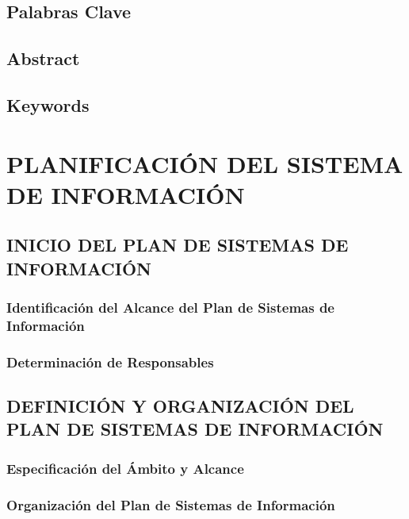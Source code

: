 \documentclass[11pt]{report}
\begin{document}
\section{Palabras Clave}


\section{Abstract}


\section{Keywords}

\pagestyle{fancy}
\chapter{PLANIFICACIÓN DEL SISTEMA DE INFORMACIÓN}


\newpage

\section{INICIO DEL PLAN DE SISTEMAS DE INFORMACIÓN}
 
\subsection{Identificación del Alcance del Plan de Sistemas de Información }


\subsection{Determinación de Responsables}


\newpage
\section{DEFINICIÓN Y ORGANIZACIÓN DEL PLAN DE SISTEMAS DE INFORMACIÓN}
 

\subsection{Especificación del Ámbito y Alcance} 


\subsection{Organización del Plan de Sistemas de Información }
\end{document}

